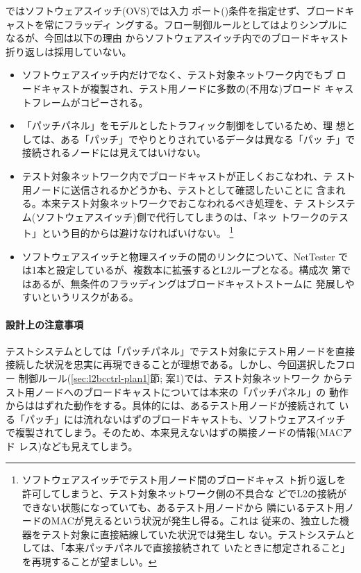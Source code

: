 ではソフトウェアスイッチ(OVS)では入力
ポート()条件を指定せず、ブロードキャストを常にフラッディ
ングする。フロー制御ルールとしてはよりシンプルになるが、今回は以下の理由
からソフトウェアスイッチ内でのブロードキャスト折り返しは採用していない。
\begin{itemize}
 \item ソフトウェアスイッチ内だけでなく、テスト対象ネットワーク内でもブ
       ロードキャストが複製され、テスト用ノードに多数の(不用な)ブロード
       キャストフレームがコピーされる。
 \item 「パッチパネル」をモデルとしたトラフィック制御をしているため、理
       想としては、ある「パッチ」でやりとりされているデータは異なる「パッ
       チ」で接続されるノードには見えてはいけない。
 \item テスト対象ネットワーク内でブロードキャストが正しくおこなわれ、テ
       スト用ノードに送信されるかどうかも、テストとして確認したいことに
       含まれる。本来テスト対象ネットワークでおこなわれるべき処理を、テ
       ストシステム(ソフトウェアスイッチ)側で代行してしまうのは、「ネッ
       トワークのテスト」という目的からは避けなければいけない。
       \footnote{ソフトウェアスイッチでテスト用ノード間のブロードキャス
       ト折り返しを許可してしまうと、テスト対象ネットワーク側の不具合な
       どでL2の接続ができない状態になっていても、あるテスト用ノードから
       隣にいるテスト用ノードのMACが見えるという状況が発生し得る。これは
       従来の、独立した機器をテスト対象に直接結線していた状況では発生し
       ない。テストシステムとしては、「本来パッチパネルで直接接続されて
       いたときに想定されること」を再現することが望ましい。}
 \item ソフトウェアスイッチと物理スイッチの間のリンクについて、NetTester
       では1本と設定しているが、複数本に拡張するとL2ループとなる。構成次
       第ではあるが、無条件のフラッディングはブロードキャストストームに
       発展しやすいというリスクがある。
\end{itemize}

\paragraph{設計上の注意事項}

テストシステムとしては「パッチパネル」でテスト対象にテスト用ノードを直接
接続した状況を忠実に再現できることが理想である。しかし、今回選択したフロー
制御ルール(\ref{sec:l2bcctrl-plan1}節; 案1)では、テスト対象ネットワーク
からテスト用ノードへのブロードキャストについては本来の「パッチパネル」の
動作からははずれた動作をする。具体的には、あるテスト用ノードが接続されて
いる「パッチ」には流れないはずのブロードキャストも、ソフトウェアスイッチ
で複製されてしまう。そのため、本来見えないはずの隣接ノードの情報(MACアド
レス)なども見えてしまう。

